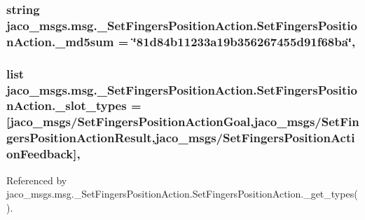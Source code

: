 \subsubsection[{\texorpdfstring{\+\_\+md5sum}{_md5sum}}]{\setlength{\rightskip}{0pt plus 5cm}string jaco\+\_\+msgs.\+msg.\+\_\+\+Set\+Fingers\+Position\+Action.\+Set\+Fingers\+Position\+Action.\+\_\+md5sum = \char`\"{}81d84b11233a19b356267455d91f68ba\char`\"{}\hspace{0.3cm}{\ttfamily [static]}, {\ttfamily [private]}}\hypertarget{classjaco__msgs_1_1msg_1_1__SetFingersPositionAction_1_1SetFingersPositionAction_a0c472dafbfd8121501817aa1006a9bd9}{}\label{classjaco__msgs_1_1msg_1_1__SetFingersPositionAction_1_1SetFingersPositionAction_a0c472dafbfd8121501817aa1006a9bd9}
\subsubsection[{\texorpdfstring{\+\_\+slot\+\_\+types}{_slot_types}}]{\setlength{\rightskip}{0pt plus 5cm}list jaco\+\_\+msgs.\+msg.\+\_\+\+Set\+Fingers\+Position\+Action.\+Set\+Fingers\+Position\+Action.\+\_\+slot\+\_\+types = \mbox{[}\textquotesingle{}jaco\+\_\+msgs/{\bf Set\+Fingers\+Position\+Action\+Goal}\textquotesingle{},\textquotesingle{}jaco\+\_\+msgs/{\bf Set\+Fingers\+Position\+Action\+Result}\textquotesingle{},\textquotesingle{}jaco\+\_\+msgs/{\bf Set\+Fingers\+Position\+Action\+Feedback}\textquotesingle{}\mbox{]}\hspace{0.3cm}{\ttfamily [static]}, {\ttfamily [private]}}\hypertarget{classjaco__msgs_1_1msg_1_1__SetFingersPositionAction_1_1SetFingersPositionAction_a0cf71e7b8919a831d7866c749ff2f76a}{}\label{classjaco__msgs_1_1msg_1_1__SetFingersPositionAction_1_1SetFingersPositionAction_a0cf71e7b8919a831d7866c749ff2f76a}


Referenced by jaco\+\_\+msgs.\+msg.\+\_\+\+Set\+Fingers\+Position\+Action.\+Set\+Fingers\+Position\+Action.\+\_\+get\+\_\+types().

